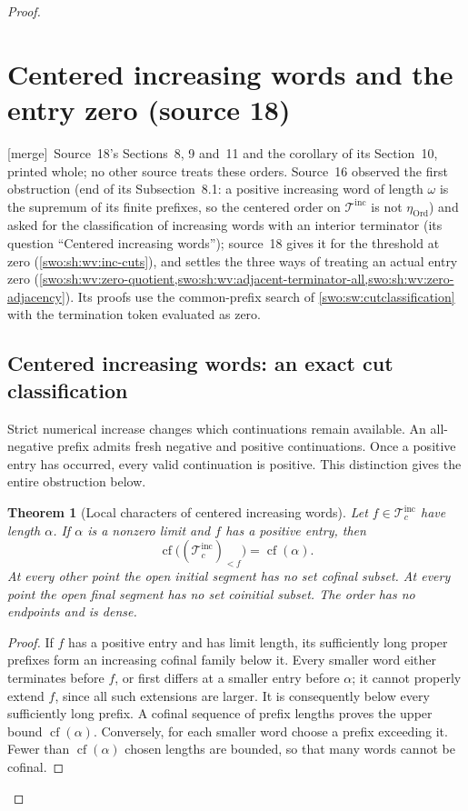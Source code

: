 \documentclass[11pt]{article}
\newtheorem{theorem}{Theorem}[section]
\theoremstyle{definition}
\theoremstyle{remark}
\newcommand{\Ord}{\mathrm{Ord}}
\newcommand{\merge}{\textsf{[merge]}}
\newcommand{\WordsInc}{\mathcal T^{\mathrm{inc}}}
\begin{document}
\begin{proof}
\section{Centered increasing words and the entry zero (source 18)}\label{swo:vii:sec:centered}

\merge\ Source~18's Sections~8, 9 and~11 and the corollary of its Section~10,
printed whole; no other source treats these orders. Source~16 observed the
first obstruction (end of its Subsection~8.1: a positive increasing word of
length $\omega$ is the supremum of its finite prefixes, so the centered order
on $\WordsInc$ is not $\eta_{\Ord}$) and asked for the classification of
increasing words with an interior terminator (its question ``Centered
increasing words''); source~18 gives it for the threshold at zero
(\cref{swo:sh:wv:inc-cuts}), and settles the three ways of treating an
actual entry zero (\cref{swo:sh:wv:zero-quotient,swo:sh:wv:adjacent-terminator-all,swo:sh:wv:zero-adjacency}).
Its proofs use the common-prefix search of \cref{swo:sw:cutclassification}
with the termination token evaluated as zero.

\subsection{Centered increasing words: an exact cut classification}
\label{swo:sh:wv:increasing}

Strict numerical increase changes which continuations remain
available.  An all-negative prefix admits fresh negative and positive
continuations.  Once a positive entry has occurred, every valid
continuation is positive.  This distinction gives the entire
obstruction below.

\begin{theorem}[Local characters of centered increasing words]
\label{swo:sh:wv:inc-characters}
Let \(f\in\WordsInc_c\) have length \(\alpha\).
If \(\alpha\) is a nonzero limit and \(f\) has a positive entry, then
\[
 \operatorname{cf}\bigl((\WordsInc_c)_{<f}\bigr)
                  =\operatorname{cf}(\alpha).
\]
At every other point the open initial segment has no set cofinal
subset.  At every point the open final segment has no set coinitial
subset.  The order has no endpoints and is dense.
\end{theorem}

\begin{proof}
If \(f\) has a positive entry and has limit length, its sufficiently
long proper prefixes form an increasing cofinal family below it.
Every smaller word either terminates before \(f\), or first differs
at a smaller entry before \(\alpha\); it cannot properly extend
\(f\), since all such extensions are larger.  It is consequently
below every sufficiently long prefix.  A cofinal sequence of prefix
lengths proves the upper bound \(\operatorname{cf}(\alpha)\).
Conversely, for each smaller word choose a prefix exceeding it.
Fewer than \(\operatorname{cf}(\alpha)\) chosen lengths are bounded,
so that many words cannot be cofinal.


\end{proof}
\end{proof}
\end{document}
